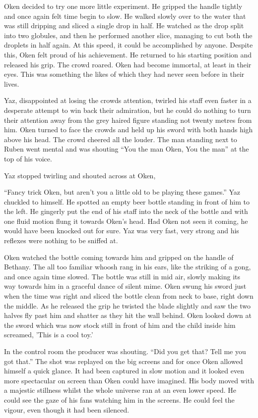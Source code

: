 Oken decided to try one more little experiment. He gripped the handle tightly and once again felt time begin to slow. He walked slowly over to the water that was still dripping and sliced a single drop in half. He watched as the drop split into two globules, and then he performed another slice, managing to cut both the droplets in half again. At this speed, it could be accomplished by anyone. Despite this, Oken felt proud of his achievement. He returned to his starting position and released his grip. The crowd roared. Oken had become immortal, at least in their eyes. This was something the likes of which they had never seen before in their lives.

Yaz, disappointed at losing the crowds attention, twirled his staff even faster in a desperate attempt to win back their admiration, but he could do nothing to turn their attention away from the grey haired figure standing not twenty metres from him. Oken turned to face the crowds and held up his sword with both hands high above his head. The crowd cheered all the louder. The man standing next to Ruben went mental and was shouting ``You the man Oken, You the man'' at the top of his voice.

Yaz stopped twirling and shouted across at Oken,

``Fancy trick Oken, but aren't you a little old to be playing these games.'' Yaz chuckled to himself. He spotted an empty beer bottle standing in front of him to the left. He gingerly put the end of his staff into the neck of the bottle and with one fluid motion flung it towards Oken's head. Had Oken not seen it coming, he would have been knocked out for sure. Yaz was very fast, very strong and his reflexes were nothing to be sniffed at.

Oken watched the bottle coming towards him and gripped on the handle of Bethany. The all too familiar whoosh rang in his ears, like the striking of a gong, and once again time slowed. The bottle was still in mid air, slowly making its way towards him in a graceful dance of silent mime. Oken swung his sword just when the time was right and sliced the bottle clean from neck to base, right down the middle. As he released the grip he twisted the blade slightly and saw the two halves fly past him and shatter as they hit the wall behind. Oken looked down at the sword which was now stock still in front of him and the child inside him screamed, 'This is a cool toy.'

In the control room the producer was shouting. ``Did you get that? Tell me you got that.'' The shot was replayed on the big screens and for once Oken allowed himself a quick glance. It had been captured in slow motion and it looked even more spectacular on screen than Oken could have imagined. His body moved with a majestic stillness whilst the whole universe ran at an even lower speed. He could see the gaze of his fans watching him in the screens. He could feel the vigour, even though it had been silenced.

